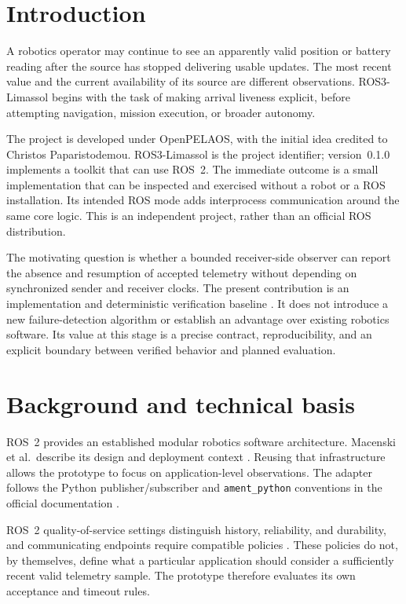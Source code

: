 \documentclass[11pt,a4paper]{article}
\newcommand{\code}[1]{\texttt{#1}}
\begin{document}
\section{Introduction}
A robotics operator may continue to see an apparently valid position or battery
reading after the source has stopped delivering usable updates. The most recent
value and the current availability of its source are different observations.
ROS3-Limassol begins with the task of making arrival liveness explicit, before
attempting navigation, mission execution, or broader autonomy.

The project is developed under OpenPELAOS, with the initial idea credited to
Christos Paparistodemou. ROS3-Limassol is the project identifier; version~0.1.0
implements a toolkit that can use ROS~2. The immediate outcome is a small
implementation that can be inspected and exercised without a robot or a ROS
installation. Its intended ROS mode adds interprocess communication around the
same core logic. This is an independent project, rather than an official
ROS distribution.

The motivating question is whether a bounded receiver-side observer can report
the absence and resumption of accepted telemetry without depending on synchronized
sender and receiver clocks. The present contribution is an implementation and
deterministic verification baseline \cite{artifact}. It does not introduce a new
failure-detection algorithm or establish an advantage over existing robotics
software. Its value at this stage is a precise contract, reproducibility, and
an explicit boundary between verified behavior and planned evaluation.

\section{Background and technical basis}
ROS~2 provides an established modular robotics software architecture.
Macenski et al.\ describe its design and deployment context
\cite{macenski2022}. Reusing that infrastructure allows the prototype to focus on
application-level observations. The adapter follows the Python publisher/subscriber
and \code{ament\_python} conventions in the official documentation
\cite{ros_python}.

ROS~2 quality-of-service settings distinguish history, reliability, and durability,
and communicating endpoints require compatible policies \cite{ros_qos}.
These policies do not, by themselves, define what a particular application should
consider a sufficiently recent valid telemetry sample. The prototype therefore
evaluates its own acceptance and timeout rules.
\end{document}

